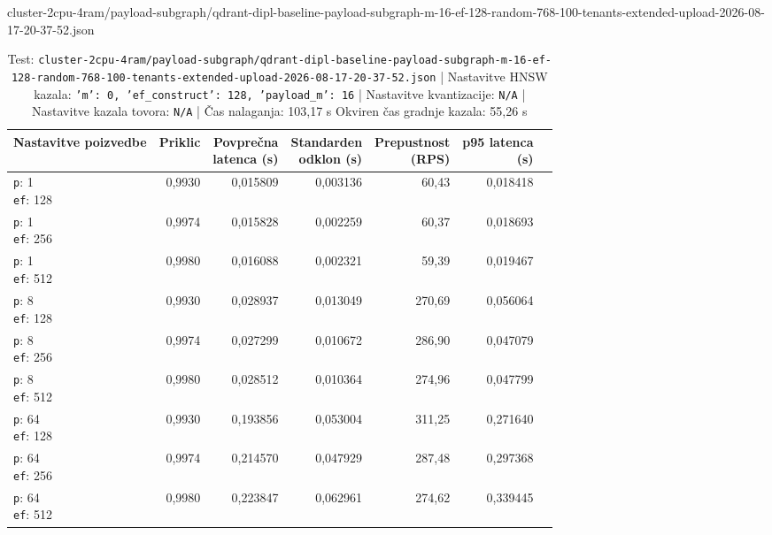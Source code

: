 \begin{table}[htbp]
  \centering
\small
  \caption{cluster-2cpu-4ram/payload-subgraph/qdrant-dipl-baseline-payload-subgraph-m-16-ef-128-random-768-100-tenants-extended-upload-2026-08-17-20-37-52.json}
  \label{tab:cluster-2cpu-4ram:payload-subgraph:qdrant-dipl-baseline-payload-subgraph-m-16-ef-128-random-768-100-tenants-extended-upload-2026-08-17-20-37-52.json}
  \begin{tabularx}{\textwidth}{Xrrrrrr}
    \toprule
    Nastavitve poizvedbe & Priklic & \makecell{Povprečna\\latenca (s)} & \makecell{Standarden\\odklon (s)} & \makecell{Prepustnost\\(RPS)} & \makecell{p95 latenca\\(s)}  \\
    \midrule
    \makecell{\texttt{p}: 1\\\texttt{ef}: 128} & 0,9930 & 0,015809 & 0,003136 & 60,43 & 0,018418 \\
    \makecell{\texttt{p}: 1\\\texttt{ef}: 256} & 0,9974 & 0,015828 & 0,002259 & 60,37 & 0,018693 \\
    \makecell{\texttt{p}: 1\\\texttt{ef}: 512} & 0,9980 & 0,016088 & 0,002321 & 59,39 & 0,019467 \\
    \makecell{\texttt{p}: 8\\\texttt{ef}: 128} & 0,9930 & 0,028937 & 0,013049 & 270,69 & 0,056064 \\
    \makecell{\texttt{p}: 8\\\texttt{ef}: 256} & 0,9974 & 0,027299 & 0,010672 & 286,90 & 0,047079 \\
    \makecell{\texttt{p}: 8\\\texttt{ef}: 512} & 0,9980 & 0,028512 & 0,010364 & 274,96 & 0,047799 \\
    \makecell{\texttt{p}: 64\\\texttt{ef}: 128} & 0,9930 & 0,193856 & 0,053004 & 311,25 & 0,271640 \\
    \makecell{\texttt{p}: 64\\\texttt{ef}: 256} & 0,9974 & 0,214570 & 0,047929 & 287,48 & 0,297368 \\
    \makecell{\texttt{p}: 64\\\texttt{ef}: 512} & 0,9980 & 0,223847 & 0,062961 & 274,62 & 0,339445 \\
    \bottomrule
  \end{tabularx}
\caption* {Test: \texttt{cluster-2cpu-4ram/payload-subgraph/qdrant-dipl-baseline-payload-subgraph-m-16-ef-128-random-768-100-tenants-extended-upload-2026-08-17-20-37-52.json} | Nastavitve HNSW kazala: \texttt{{'m': 0, 'ef\_construct': 128, 'payload\_m': 16}} | Nastavitve kvantizacije: \texttt{N/A} | Nastavitve kazala tovora: \texttt{N/A} | Čas nalaganja: 103,17 s Okviren čas gradnje kazala: 55,26 s}\end{table}


